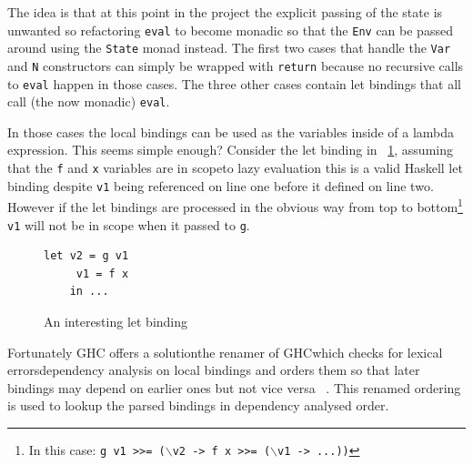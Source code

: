 The idea is that at this point in the project the explicit passing of the state is unwanted so refactoring \texttt{eval} to become monadic so that the \texttt{Env} can be passed around using the \texttt{State} monad instead. The first two cases that handle the \texttt{Var} and \texttt{N} constructors can simply be wrapped with \texttt{return} because no recursive calls to \texttt{eval} happen in those cases. The three other cases contain let bindings that all call (the now monadic) \texttt{eval}. 

In those cases the local bindings can be used as the variables inside of a lambda expression. This seems simple enough\DIFdelbegin {}\DIFdelend \DIFaddbegin {}\DIFaddend ? Consider the let binding in \DIFdelbegin {}\DIFdelend \DIFaddbegin {}\DIFaddend ~\ref{intLet}, assuming that the \texttt{f} and \texttt{x} variables are in scope\DIFdelbegin {}\DIFdelend \DIFaddbegin {}\DIFaddend to lazy evaluation this is a valid Haskell let binding despite \texttt{v1} being referenced on line one before it \DIFdelbegin {}\DIFdelend \DIFaddbegin {}\DIFaddend defined on line two. However if the let bindings are processed in the obvious way from top to bottom\footnote{In this case: \texttt{g v1 >>= ($\backslash$v2 -> f x >>= ($\backslash$v1 -> ...))}} \texttt{v1} will not be in scope when it \DIFdelbegin {}\DIFdelend \DIFaddbegin {}\DIFaddend passed to \texttt{g}.  

\begin{figure}[t]
\begin{lstlisting}
let v2 = g v1
     v1 = f x
    in ...
\end{lstlisting}
\caption{An interesting let binding}
\label{intLet}
\end{figure}

Fortunately GHC offers a solution\DIFdelbegin \DIFdel{, }\DIFdelend \DIFaddbegin \DIFadd{: }\DIFaddend the renamer of GHC\DIFaddbegin \DIFadd{, }\DIFaddend which checks for lexical errors\DIFdelbegin {}\DIFdelend \DIFaddbegin {}\DIFaddend dependency analysis on local bindings and orders them so that later bindings may depend on earlier ones but not vice versa \DIFaddbegin {}\DIFaddend ~\citep{ghcApi}. This renamed ordering is used to lookup the parsed bindings in dependency analysed order.

